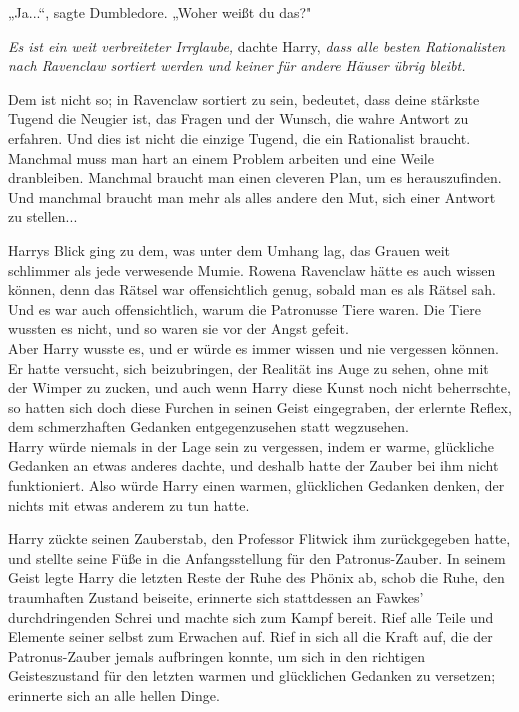 {„Ja...“, sagte Dumbledore. „Woher weißt du das?"

\emph{Es ist ein weit verbreiteter Irrglaube,} dachte Harry, \emph{dass alle besten Rationalisten nach Ravenclaw sortiert werden und keiner für andere Häuser übrig bleibt.}

Dem ist nicht so; in Ravenclaw sortiert zu sein, bedeutet, dass deine stärkste Tugend die Neugier ist, das Fragen und der Wunsch, die wahre Antwort zu erfahren. Und dies ist nicht die einzige Tugend, die ein Rationalist braucht. Manchmal muss man hart an einem Problem arbeiten und eine Weile dranbleiben. Manchmal braucht man einen cleveren Plan, um es herauszufinden. Und manchmal braucht man mehr als alles andere den Mut, sich einer Antwort zu stellen...

Harrys Blick ging zu dem, was unter dem Umhang lag, das Grauen weit schlimmer als jede verwesende Mumie. Rowena Ravenclaw hätte es auch wissen können, denn das Rätsel war offensichtlich genug, sobald man es als Rätsel sah. Und es war auch offensichtlich, warum die Patronusse Tiere waren. Die Tiere wussten es nicht, und so waren sie vor der Angst gefeit.\\ Aber Harry wusste es, und er würde es immer wissen und nie vergessen können. Er hatte versucht, sich beizubringen, der Realität ins Auge zu sehen, ohne mit der Wimper zu zucken, und auch wenn Harry diese Kunst noch nicht beherrschte, so hatten sich doch diese Furchen in seinen Geist eingegraben, der erlernte Reflex, dem schmerzhaften Gedanken entgegenzusehen statt wegzusehen.\\ Harry würde niemals in der Lage sein zu vergessen, indem er warme, glückliche Gedanken an etwas anderes dachte, und deshalb hatte der Zauber bei ihm nicht funktioniert. Also würde Harry einen warmen, glücklichen Gedanken denken, der nichts mit etwas anderem zu tun hatte.

Harry zückte seinen Zauberstab, den Professor Flitwick ihm zurückgegeben hatte, und stellte seine Füße in die Anfangsstellung für den Patronus-Zauber. In seinem Geist legte Harry die letzten Reste der Ruhe des Phönix ab, schob die Ruhe, den traumhaften Zustand beiseite, erinnerte sich stattdessen an Fawkes' durchdringenden Schrei und machte sich zum Kampf bereit. Rief alle Teile und Elemente seiner selbst zum Erwachen auf. Rief in sich all die Kraft auf, die der Patronus-Zauber jemals aufbringen konnte, um sich in den richtigen Geisteszustand für den letzten warmen und glücklichen Gedanken zu versetzen; erinnerte sich an alle hellen Dinge.

}
